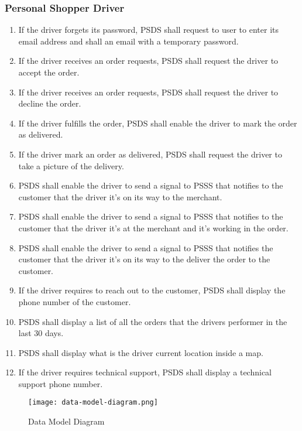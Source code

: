 \subsubsection{Personal Shopper Driver}
\begin{enumerate}[resume, label=SY-\arabic*]
    \item  If the driver forgets its password, PSDS shall request to user to 
    enter its email address and shall an email with a temporary password.
    \item  If the driver receives an order requests, PSDS shall request the 
    driver to accept the order.
    \item  If the driver receives an order requests, PSDS shall request the 
    driver to decline the order.
    \item  If the driver fulfills the order, PSDS shall enable the driver to 
    mark the order as delivered.
	\item  If the driver mark an order as delivered, PSDS shall request the 
    driver to take a picture of the delivery.
    \item  PSDS shall enable the driver to send a signal to PSSS that notifies 
    to the customer that the driver it's on its way to the merchant.
    \item  PSDS shall enable the driver to send a signal to PSSS that notifies 
    to the customer that the driver it's at the merchant and it's working 
    in the order.
    \item  PSDS shall enable the driver to send a signal to PSSS that notifies 
    the customer that the driver it's on its way to the deliver the order to 
    the customer.
    \item  If the driver requires to reach out to the customer, PSDS shall 
    display the phone number of the customer.
    \item  PSDS shall display a list of all the orders that the drivers 
    performer in the last 30 days.
    \item  PSDS shall display what is the driver current location inside a map.
    \item  If the driver requires technical support, PSDS shall display a 
    technical support phone number.
\end{enumerate}

\begin{figure}[htpb]
    \texttt{[image: data-model-diagram.png]}
    \caption{Data Model Diagram}
\end{figure}
\FloatBarrier
\pagebreak
